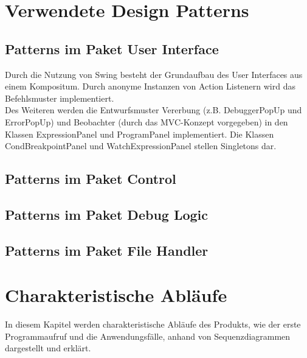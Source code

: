 \documentclass[parskip=full]{scrartcl}
\begin{document}
\section{Verwendete Design Patterns}\label{Patterns}

\subsection{Patterns im Paket User Interface}
Durch die Nutzung von Swing besteht der Grundaufbau des User Interfaces aus einem Kompositum. 
Durch anonyme Instanzen von Action Listenern wird das Befehlsmuster implementiert. \\
Des Weiteren werden die Entwurfsmuster Vererbung (z.B. DebuggerPopUp und ErrorPopUp) und Beobachter (durch das MVC-Konzept vorgegeben) in den Klassen ExpressionPanel und ProgramPanel implementiert.
Die Klassen CondBreakpointPanel und WatchExpressionPanel stellen Singletons dar.
\subsection{Patterns im Paket Control}
\subsection{Patterns im Paket Debug Logic}
\subsection{Patterns im Paket File Handler}

\newpage
\section{Charakteristische Abläufe}\label{charAbl}
In diesem Kapitel werden charakteristische Abläufe des Produkts, wie der erste Programmaufruf und die
Anwendungsfälle, anhand von Sequenzdiagrammen dargestellt und erklärt.
\end{document}

